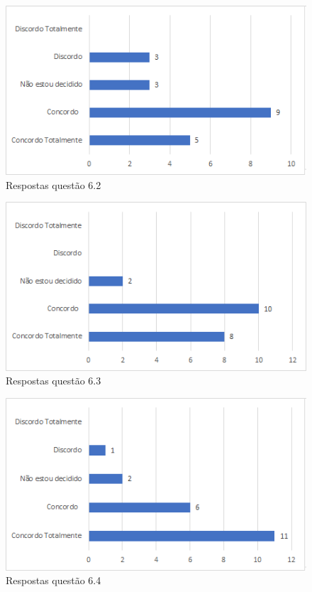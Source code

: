 \begin{figure}[!t]
\centering
\includegraphics[scale=0.7]{figuras das questoes/6.2.png}
\caption{Respostas questão 6.2}
\end{figure}

\begin{figure}[!t]
\centering
\includegraphics[scale=0.7]{figuras das questoes/6.3.png}
\caption{Respostas questão 6.3}
\end{figure}

\begin{figure}[!t]
\centering
\includegraphics[scale=0.7]{figuras das questoes/6.4.png}
\caption{Respostas questão 6.4}
\end{figure}

